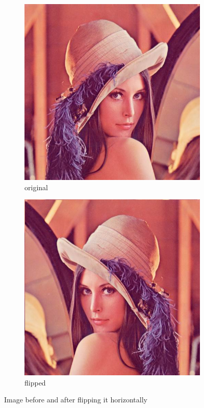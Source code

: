 \documentclass[12pt]{article}
\theoremstyle{definition}
\newcommand{\subfiguresize}{.3\textwidth}
\begin{document}
\begin{figure}[H]\centering
    \begin{subfigure}[t]{\subfiguresize}\centering
        \includegraphics[width=\textwidth]{lenac.png}
        \caption{original}
    \end{subfigure}
    \hspace{.05\textwidth}
    \begin{subfigure}[t]{\subfiguresize}\centering
        \includegraphics[width=\textwidth]{lenac_hflip.png}
        \caption{flipped}
    \end{subfigure}
    \caption{Image before and after flipping it horizontally}
\end{figure}
\end{document}
